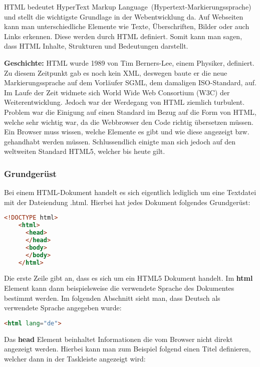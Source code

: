 HTML bedeutet HyperText Markup Language (Hypertext-Markierungssprache) und stellt die wichtigste Grundlage in der Webentwicklung da. Auf Webseiten kann man unterschiedliche Elemente wie Texte, Überschriften, Bilder oder auch Links erkennen. Diese werden durch HTML definiert. Somit kann man sagen, dass HTML Inhalte, Strukturen und Bedeutungen darstellt.

\textbf{Geschichte:}
\newline
HTML wurde 1989 von Tim Berners-Lee, einem Physiker, definiert. Zu diesem Zeitpunkt gab es noch kein XML, deswegen baute er die neue Markierungssprache auf dem Vorläufer SGML, dem damaligen ISO-Standard, auf. Im Laufe der Zeit widmete sich World Wide Web Consortium (W3C) der Weiterentwicklung.
Jedoch war der Werdegang von HTML ziemlich turbulent. Problem war die Einigung auf einen Standard im Bezug auf die Form von HTML, welche sehr wichtig war, da die Webbrowser den Code richtig übersetzen müssen. Ein Browser muss wissen, welche Elemente es gibt und wie diese angezeigt bzw. gehandhabt werden müssen. Schlussendlich einigte man sich jedoch auf den weltweiten Standard HTML5, welcher bis heute gilt.

\subsubsection{Grundgerüst}
Bei einem HTML-Dokument handelt es sich eigentlich lediglich um eine Textdatei mit der Dateiendung .html.
Hierbei hat jedes Dokument folgendes Grundgerüst:

\begin{lstlisting}[language=html]
    <!DOCTYPE html>
    <html>
      <head>
      </head>
      <body>
      </body>
    </html>
\end{lstlisting}

Die erste Zeile gibt an, dass es sich um ein HTML5 Dokument handelt. Im \textbf{html} Element kann dann beispielsweise die verwendete Sprache des Dokumentes bestimmt werden.
Im folgenden Abschnitt sieht man, dass Deutsch als verwendete Sprache angegeben wurde:

\begin{lstlisting}[language=html]
    <html lang="de">
\end{lstlisting}

Das \textbf{head} Element beinhaltet Informationen die vom Browser nicht direkt angezeigt werden. 
\newpage
Hierbei kann man zum Beispiel folgend einen Titel definieren, welcher dann in der Taskleiste angezeigt wird:


